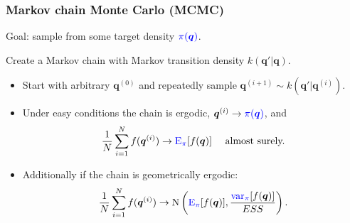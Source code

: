 \documentclass[xcolor=dvipsnames]{beamer}
\begin{document}
\begin{frame}
\frametitle{Markov chain Monte Carlo (MCMC)}
Goal: sample from some target density ${\color{blue}\pi(\bm{q})}$.\\

\vspace{0.5cm}

Create a Markov chain with Markov transition density $k(\bm{q}'|\bm{q})$.
\begin{itemize}
\item Start with arbitrary $\bm{q}^{(0)}$ and repeatedly sample $\bm{q}^{(i+1)} \sim k(\bm{q}'|\bm{q}^{(i)})$.\\

\vspace{0.2cm}

\item Under easy conditions the chain is {\color{red}ergodic}, $\bm{q}^{(i)} \to {\color{blue}\pi(\bm{q})}$, and
\begin{align*}
  \frac{1}{N}\sum_{i=1}^N f(\bm{q}^{(i)}) \to \mathrm{\color{blue}E}_{\color{blue}\pi}[f(\bm{q})]&& \mbox{ almost surely.}
\end{align*}

\vspace{0.2cm}

\item Additionally if the chain is {\color{red}geometrically ergodic}:
\begin{align*}
  \frac{1}{N}\sum_{i=1}^N f(\bm{q}^{(i)}) \to \mathrm{N}\left(\mathrm{\color{blue}E}_{\color{blue}\pi}[f(\bm{q})], \frac{\mathrm{\color{blue}var}_{\color{blue}\pi}[f(\bm{q})]}{ESS}\right).
\end{align*}
\end{itemize}
\end{frame}
\end{document}
